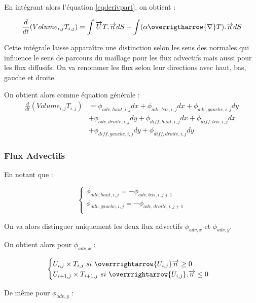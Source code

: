 \documentclass[a4paper,oneside]{article}
\begin{document}
En intégrant alors l'équation \ref{eqderivpart}, on obtient :

\[
\frac{d}{dt} (Volume_{i,j} T_{i,j})= \int \overrightarrow{U}T.\overrightarrow{n} dS + \int (\alpha\overrigtharrow{\nabla} T).\overrightarrow{n} dS
\]

Cette intégrale laisse apparaître une distinction selon les sens des normales qui influence le sens de parcours du maillage pour les flux advectifs mais aussi pour les flux diffusifs.
On va renommer les flux selon leur directions avec haut, bas, gauche et droite.

On obtient alors comme équation générale :
\begin{align*}
\frac{d}{dt} (Volume_{i,j} T_{i,j}) &= \phi_{adv,haut,i,j}dx + \phi_{adv,bas,i,j}dx + \phi_{adv,gauche,i,j}dy  \\
&+ \phi_{adv,droite,i,j}dy + \phi_{diff,haut,i,j}dx + \phi_{diff,bas,i,j}dx  \\
&+ \phi_{diff,gauche,i,j}dy + \phi_{diff,droite,i,j}dy
\end{align*}


\subsubsection{Flux Advectifs}

En notant que :

\begin{equation*}
\begin{cases}
	\phi_{adv,haut,i,j} = -\phi_{adv,bas,i,j+1}\\
	\phi_{adv,gauche,i,j}  = -\phi_{adv,droite,i,j+1}\\
\end{cases}
\end{equation*}

On va alors distinguer uniquement les deux flux advectifs 
$\phi_{adv,x}$ et $\phi_{adv,y}$.

On obtient alors pour $\phi_{adv,x}$ :

\begin{equation*}
\begin{cases}
	U_{i,j}\times T_{i,j} \ si \ \overrrightarrow{U_{i,j}}     \overrightarrow{n} \geq 0 \\
U_{i+1,j}\times T_{i+1,j} \ si \ \overrrightarrow{U_{i,j}}.\overrightarrow{n} \leq 0 \\
\end{cases}
\end{equation*}

De même pour $\phi_{adv,y}$ :
\end{document}
